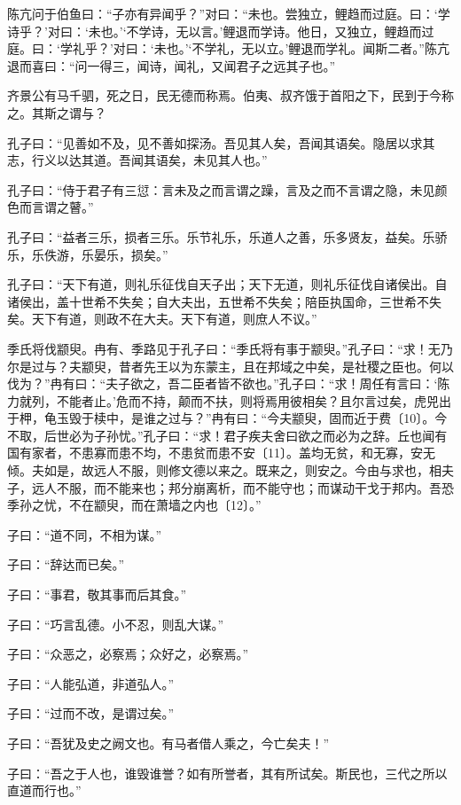 \documentclass[a5paper]{ctexbook}
\begin{document}
    陈亢问于伯鱼曰：“子亦有异闻乎？”对曰：“未也。尝独立，鲤趋而过庭。曰：‘学诗乎？’对曰：‘未也。’‘不学诗，无以言。’鲤退而学诗。他日，又独立，鲤趋而过庭。曰：‘学礼乎？’对曰：‘未也。’‘不学礼，无以立。’鲤退而学礼。闻斯二者。”陈亢退而喜曰：“问一得三，闻诗，闻礼，又闻君子之远其子也。”

    齐景公有马千驷，死之日，民无德而称焉。伯夷、叔齐饿于首阳之下，民到于今称之。其斯之谓与？

    孔子曰：“见善如不及，见不善如探汤。吾见其人矣，吾闻其语矣。隐居以求其志，行义以达其道。吾闻其语矣，未见其人也。”

    孔子曰：“侍于君子有三愆：言未及之而言谓之躁，言及之而不言谓之隐，未见颜色而言谓之瞽。”

    孔子曰：“益者三乐，损者三乐。乐节礼乐，乐道人之善，乐多贤友，益矣。乐骄乐，乐佚游，乐晏乐，损矣。”

    孔子曰：“天下有道，则礼乐征伐自天子出；天下无道，则礼乐征伐自诸侯出。自诸侯出，盖十世希不失矣；自大夫出，五世希不失矣；陪臣执国命，三世希不失矣。天下有道，则政不在大夫。天下有道，则庶人不议。”

    季氏将伐颛臾。冉有、季路见于孔子曰：“季氏将有事于颛臾。”孔子曰：“求！无乃尔是过与？夫颛臾，昔者先王以为东蒙主，且在邦域之中矣，是社稷之臣也。何以伐为？”冉有曰：“夫子欲之，吾二臣者皆不欲也。”孔子曰：“求！周任有言曰：‘陈力就列，不能者止。’危而不持，颠而不扶，则将焉用彼相矣？且尔言过矣，虎兕出于柙，龟玉毁于椟中，是谁之过与？”冉有曰：“今夫颛臾，固而近于费〔10〕。今不取，后世必为子孙忧。”孔子曰：“求！君子疾夫舍曰欲之而必为之辞。丘也闻有国有家者，不患寡而患不均，不患贫而患不安〔11〕。盖均无贫，和无寡，安无倾。夫如是，故远人不服，则修文德以来之。既来之，则安之。今由与求也，相夫子，远人不服，而不能来也；邦分崩离析，而不能守也；而谋动干戈于邦内。吾恐季孙之忧，不在颛臾，而在萧墙之内也〔12〕。”

    子曰：“道不同，不相为谋。”
    
    子曰：“辞达而已矣。”

    子曰：“事君，敬其事而后其食。”

    子曰：“巧言乱德。小不忍，则乱大谋。”
    
    子曰：“众恶之，必察焉；众好之，必察焉。”
    
    子曰：“人能弘道，非道弘人。”
    
    子曰：“过而不改，是谓过矣。”

    子曰：“吾犹及史之阙文也。有马者借人乘之，今亡矣夫！”

    子曰：“吾之于人也，谁毁谁誉？如有所誉者，其有所试矣。斯民也，三代之所以直道而行也。”
\end{document}
